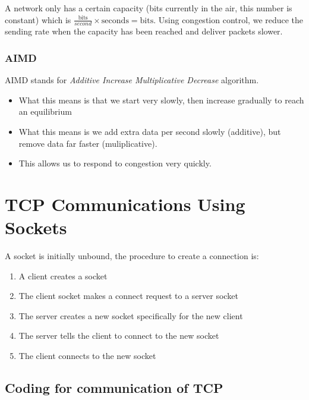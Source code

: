 A network only has a certain capacity (bits currently in the air, this number is constant) which is \(\frac{\mathrm{bits}}{second} \times \mathrm{seconds} = \mathrm{bits}\).
Using congestion control, we reduce the sending rate when the capacity has been reached and deliver packets slower.

\subsubsection{AIMD}\label{ssub:aimd}

AIMD stands for \emph{Additive Increase Multiplicative Decrease} algorithm.
\begin{itemize}
	\item What this means is that we start very slowly, then increase gradually to reach an equilibrium
	\item What this means is we add extra data per second slowly (additive), but remove data far faster (muliplicative).
	\item This allows us to respond to congestion very quickly.
\end{itemize}

\section{TCP Communications Using Sockets}\label{sec:tcp_communications_using_sockets}

A socket is initially unbound, the procedure to create a connection is:
\begin{enumerate}
	\item A client creates a socket
	\item The client socket makes a connect request to a server socket
	\item The server creates a new socket specifically for the new client
	\item The server tells the client to connect to the new socket
	\item The client connects to the new socket
\end{enumerate}

\subsection{Coding for communication of TCP}\label{sub:coding_for_communication_of_tcp}

